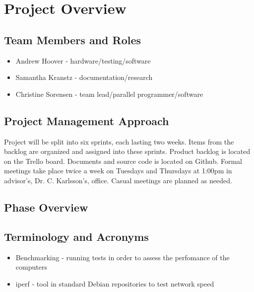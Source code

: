

\chapter{Project Overview}



\section{Team Members and Roles}
\begin{itemize}
	\item Andrew Hoover - hardware/testing/software
	\item Samantha Kranstz - documentation/research
	\item Christine Sorensen - team lead/parallel programmer/software
\end{itemize}

\section{Project  Management Approach}
Project will be split into six sprints, each lasting two weeks. Items from the backlog are organized and assigned into these sprints. \newline \newline Product backlog is located on the Trello board. Documents and source code is located on Github. \newline \newline Formal meetings take place twice a week on Tuesdays and Thursdays at 1:00pm in advisor's, Dr. C. Karlsson's, office. Casual meetings are planned as needed.

\section{Phase  Overview}



\section{Terminology and Acronyms}
\begin{itemize}
	\item Benchmarking - running tests in order to assess the perfomance of the computers
	\item iperf - tool in standard Debian repositories to test network speed
\end{itemize}


